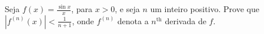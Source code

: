 Seja \(f(x)=\frac{\sin x}{x}\), para \(x>0\), e seja \(n\) um inteiro positivo. Prove que \(|f^{(n)}(x)|<\frac{1}{n+1}\), onde \(f^{(n)}\) denota a \(n^{\mathrm{th}}\) derivada de \(f\).
